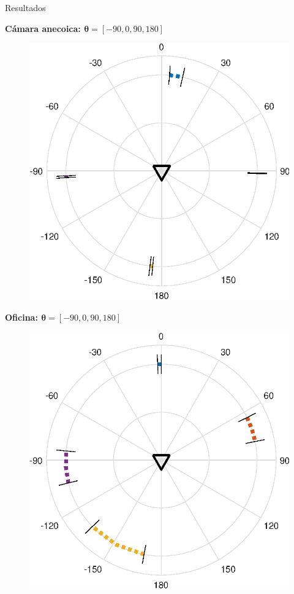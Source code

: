 \documentclass[12pt,aspectratio=169]{beamer}
\begin{document}
	\begin{frame}{Resultados}
		\begin{minipage}{70mm}
			\textbf{Cámara anecoica: $\pmb{\theta} = [-90, 0, 90, 180]$}
			\begin{figure}[h]
				\centering
				\includegraphics[width=0.9\linewidth]{figures/4Clean.eps}
			\end{figure}
		\end{minipage}
		\begin{minipage}{70mm}
			\hspace{10mm}\textbf{Oficina: $\pmb{\theta} = [-90, 0, 90, 180]$}
			\begin{figure}[h]
				\centering
				\includegraphics[width=0.9\linewidth]{figures/4Noisy.eps}
			\end{figure}
		\end{minipage}
	\end{frame}
	
\end{document}

